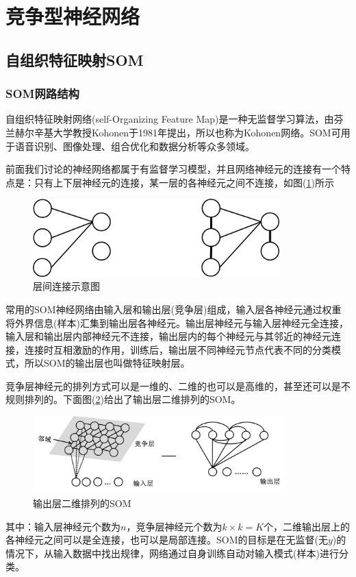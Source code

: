 {\section{竞争型神经网络}
    \subsection{自组织特征映射SOM}
        \subsubsection{SOM网路结构}
            \par
            自组织特征映射网络(self-Organizing Feature Map)是一种无监督学习算法，由芬兰赫尔辛基大学教授Kohonen于1981年提出，所以也称为Kohonen网络。SOM可用于语音识别、图像处理、组合优化和数据分析等众多领域。
            \par
            前面我们讨论的神经网络都属于有监督学习模型，并且网络神经元的连接有一个特点是：只有上下层神经元的连接，某一层的各神经元之间不连接，如图(\ref{fig:层间连接示意图})所示
            \begin{figure}[H]
            \centering
            \includegraphics[height=3cm]{images/Interconnection.jpg}
            \caption{层间连接示意图}
            \label{fig:层间连接示意图}
            \end{figure}
            \par
            常用的SOM神经网络由输入层和输出层(竞争层)组成，输入层各神经元通过权重将外界信息(样本)汇集到输出层各神经元。输出层神经元与输入层神经元全连接，输入层和输出层内部神经元不连接，输出层内的每个神经元与其邻近的神经元连接，连接时互相激励的作用，训练后，输出层不同神经元节点代表不同的分类模式，所以SOM的输出层也叫做特征映射层。
            \par
            竞争层神经元的排列方式可以是一维的、二维的也可以是高维的，甚至还可以是不规则排列的。下面图(\ref{fig:输出层二维排列的SOM})给出了输出层二维排列的SOM。
            \begin{figure}[H]
            \centering
            \includegraphics[height=3cm]{images/Output_layer_two_dimensional_arrangement_of_SOM.jpg}
            \caption{输出层二维排列的SOM}
            \label{fig:输出层二维排列的SOM}
            \end{figure}
            其中：输入层神经元个数为$n$，竞争层神经元个数为$k\times k = K$个，二维输出层上的各神经元之间可以是全连接，也可以是局部连接。SOM的目标是在无监督(无$y$)的情况下，从输入数据中找出规律，网络通过自身训练自动对输入模式(样本)进行分类。
}
